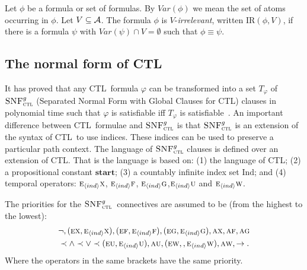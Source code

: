 \documentclass[runningheads]{llncs}
\newcommand{\tuple}[1]{{\langle{#1}\rangle}}
\newcommand{\rto}{\rightarrow}
\newcommand{\Var}{\textit{Var}}
\newcommand{\start}{\textbf{start}}
\newcommand{\CTL}{\textrm{CTL}}
\newcommand{\Ind}{\textrm{Ind}}
\newcommand{\ALL}{\textsc{a}}
\newcommand{\EXIST}{\textsc{e}}
\newcommand{\NEXT}{\textsc{x}}
\newcommand{\FUTURE}{\textsc{f}}
\newcommand{\UNTIL}{\textsc{u}}
\newcommand{\GLOBAL}{\textsc{g}}
\newcommand{\UNLESS}{\textsc{w}}
\newcommand{\IR}{\textrm{IR}}
\newcommand{\CTLsnf}{{\textsc{SNF}_{\textsc{ctl}}^g}}
\begin{document}
Let $\phi$ be a formula or set of formulas. By $\Var(\phi)$ we mean the set of atoms occurring in $\phi$.
Let $V\subseteq\cal A$.
The formula $\phi$ is $V$-{\em irrelevant}, written $\IR(\phi,V)$,
if there is a formula $\psi$ with
$\Var(\psi)\cap V=\emptyset$ such that $\phi\equiv\psi$.


\subsection{The normal form of \CTL}
It has proved that any \CTL\ formula $\varphi$ can be transformed into a set $T_\varphi$ of $\CTLsnf$ (Separated Normal Form with Global Clauses for \CTL) clauses in polynomial time such that $\varphi$ is satisfiable iff $T_\varphi$ is satisfiable~\cite{zhang2008first}.
An important difference between \CTL\ formulae and $\CTLsnf$ is that $\CTLsnf$ is an extension of the syntax of \CTL\ to use indices. These indices can be used to preserve a particular path context. The language of $\CTLsnf$ clauses is defined over an extension of \CTL. That is the language is based on: (1) the language of CTL; (2) a propositional constant $\start$; (3) a countably infinite index set $\Ind$; and (4) temporal operators: $\EXIST_{\tuple{ind}} \NEXT$, $\EXIST_{\tuple{ind}} \FUTURE$, $\EXIST_{\tuple{ind}} \GLOBAL$,$\EXIST_{\tuple{ind}} \UNTIL$ and $\EXIST_{\tuple{ind}} \UNLESS$.

The priorities for the $\CTLsnf$\ connectives are assumed to be (from the highest to the lowest):
\begin{align*}
  &\neg, (\EXIST\NEXT,\EXIST_{\tuple{ind}}\NEXT), (\EXIST\FUTURE ,\EXIST_{\tuple{ind}}\FUTURE), (\EXIST\GLOBAL,\EXIST_{\tuple{ind}} \GLOBAL), \ALL\NEXT, \ALL\FUTURE, \ALL\GLOBAL \\
  &\prec \land \prec \lor \prec (\EXIST\UNTIL,\EXIST_{\tuple{ind}} \UNTIL), \ALL\UNTIL, (\EXIST \UNLESS, ,\EXIST_{\tuple{ind}}\UNLESS), \ALL \UNLESS, \rto.
\end{align*}
Where the operators in the same brackets have the same priority.
\end{document}
